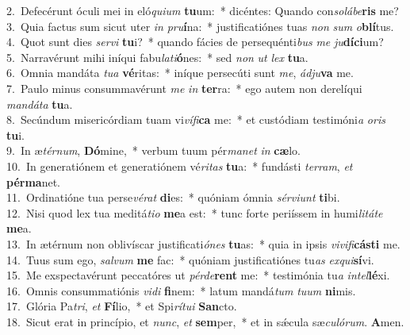 {2.~}Defecérunt óculi mei in eló\textit{qui}\textit{um} \textbf{tu}um:~* dicéntes: Quando con\textit{so}\textit{lá}\textit{be}\textbf{ris} me?\\
{3.~}Quia factus sum sicut uter \textit{in} \textit{pru}\textbf{í}na:~* justificatiónes tuas \textit{non} \textit{sum} \textit{o}\textbf{blí}tus.\\
{4.~}Quot sunt dies \textit{ser}\textit{vi} \textbf{tu}i?~* quando fácies de persequénti\textit{bus} \textit{me} \textit{ju}\textbf{dí}\textbf{ci}um?\\
{5.~}Narravérunt mihi iníqui fabu\textit{la}\textit{ti}\textbf{ó}nes:~* sed \textit{non} \textit{ut} \textit{lex} \textbf{tu}a.\\
{6.~}Omnia mandáta \textit{tu}\textit{a} \textbf{vé}ritas:~* iníque persecúti sunt \textit{me}, \textit{ád}\textit{ju}\textbf{va} me.\\
{7.~}Paulo minus consummavérunt \textit{me} \textit{in} \textbf{ter}ra:~* ego autem non derelíqui \textit{man}\textit{dá}\textit{ta} \textbf{tu}a.\\
{8.~}Secúndum misericórdiam tuam vi\textit{ví}\textit{fi}\textbf{ca} me:~* et custódiam testimóni\textit{a} \textit{o}\textit{ris} \textbf{tu}i.\\
{9.~}In æ\textit{tér}\textit{num}, \textbf{Dó}mine,~* verbum tuum pér\textit{ma}\textit{net} \textit{in} \textbf{cæ}lo.\\
{10.~}In generatiónem et generatiónem vé\textit{ri}\textit{tas} \textbf{tu}a:~* fundásti \textit{ter}\textit{ram}, \textit{et} \textbf{pér}\textbf{ma}net.\\
{11.~}Ordinatióne tua perse\textit{vé}\textit{rat} \textbf{di}es:~* quóniam ómnia \textit{sér}\textit{vi}\textit{unt} \textbf{ti}bi.\\
{12.~}Nisi quod lex tua meditá\textit{ti}\textit{o} \textbf{me}a est:~* tunc forte periíssem in humi\textit{li}\textit{tá}\textit{te} \textbf{me}a.\\
{13.~}In ætérnum non oblivíscar justificati\textit{ó}\textit{nes} \textbf{tu}as:~* quia in ipsis \textit{vi}\textit{vi}\textit{fi}\textbf{cá}\textbf{sti} me.\\
{14.~}Tuus sum ego, \textit{sal}\textit{vum} \textbf{me} fac:~* quóniam justificatiónes tu\textit{as} \textit{ex}\textit{qui}\textbf{sí}vi.\\
{15.~}Me exspectavérunt peccatóres ut \textit{pér}\textit{de}\textbf{rent} me:~* testimónia tu\textit{a} \textit{in}\textit{tel}\textbf{lé}xi.\\
{16.~}Omnis consummatiónis \textit{vi}\textit{di} \textbf{fi}nem:~* latum mandá\textit{tum} \textit{tu}\textit{um} \textbf{ni}mis.\\
{17.~}Glória Pa\textit{tri}, \textit{et} \textbf{Fí}lio,~* et Spi\textit{rí}\textit{tu}\textit{i} \textbf{San}cto.\\
{18.~}Sicut erat in princípio, et \textit{nunc}, \textit{et} \textbf{sem}per,~* et in sǽcula sæ\textit{cu}\textit{ló}\textit{rum}. \textbf{A}men.\\
